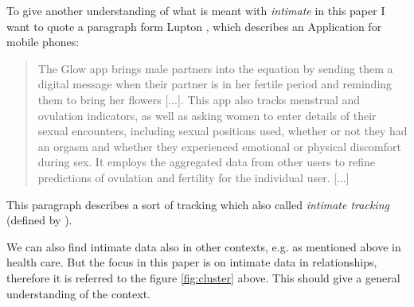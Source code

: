 To give another understanding of what is meant with \textit{intimate} in this paper I want to quote a paragraph form Lupton \cite{doi:10.1080/13691058.2014.920528}, which describes an Application for mobile phones:
\begin{quote}
	The	Glow app brings male partners into the equation by sending them a digital
	message when their partner is in her fertile period and reminding them to bring her flowers	[...]. This app also tracks menstrual and ovulation indicators, as well as asking women to enter details of their sexual encounters, including sexual positions used, whether or not they had an orgasm and whether they experienced emotional or physical discomfort during sex. It employs the aggregated data from other users to refine predictions of ovulation and fertility for the individual user. [...]
\end{quote}
This paragraph describes a sort of tracking which also called \textit{intimate tracking} (defined by \cite{doi:10.1080/15265161.2017.1409823}).

We can also find intimate data also in other contexts, e.g. as mentioned above in health care.
But the focus in this paper is on intimate data in relationships, therefore it is referred to the figure \ref{fig:cluster} above. This should give a general understanding of the context. 
